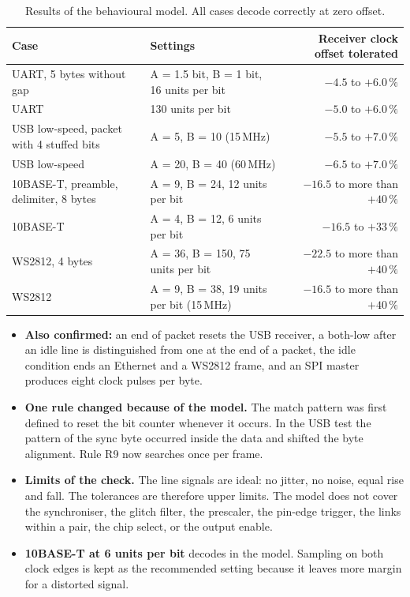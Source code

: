 \documentclass[10pt,a4paper]{article}
\begin{document}
\begin{table}[H]
\centering\small
\begin{tabularx}{\linewidth}{@{}Llr@{}}
\toprule
Case & Settings & Receiver clock offset tolerated \\
\midrule
UART, 5 bytes without gap & A = 1.5 bit, B = 1 bit, 16 units per bit & $-4.5$ to $+6.0\,\%$ \\
UART & 130 units per bit & $-5.0$ to $+6.0\,\%$ \\
USB low-speed, packet with 4 stuffed bits & A = 5, B = 10 (15\,MHz) & $-5.5$ to $+7.0\,\%$ \\
USB low-speed & A = 20, B = 40 (60\,MHz) & $-6.5$ to $+7.0\,\%$ \\
10BASE-T, preamble, delimiter, 8 bytes & A = 9, B = 24, 12 units per bit & $-16.5$ to more than $+40\,\%$ \\
10BASE-T & A = 4, B = 12, 6 units per bit & $-16.5$ to $+33\,\%$ \\
WS2812, 4 bytes & A = 36, B = 150, 75 units per bit & $-22.5$ to more than $+40\,\%$ \\
WS2812 & A = 9, B = 38, 19 units per bit (15\,MHz) & $-16.5$ to more than $+40\,\%$ \\
\bottomrule
\end{tabularx}
\caption{Results of the behavioural model. All cases decode correctly at zero offset.}
\end{table}

\begin{itemize}
\item \textbf{Also confirmed:} an end of packet resets the USB receiver, a both-low after an idle line is
distinguished from one at the end of a packet, the idle condition ends an Ethernet and a WS2812 frame, and an
SPI master produces eight clock pulses per byte.
\item \textbf{One rule changed because of the model.} The match pattern was first defined to reset the bit counter
whenever it occurs. In the USB test the pattern of the sync byte occurred inside the data and shifted the byte
alignment. Rule R9 now searches once per frame.
\item \textbf{Limits of the check.} The line signals are ideal: no jitter, no noise, equal rise and fall. The
tolerances are therefore upper limits. The model does not cover the synchroniser, the glitch filter, the
prescaler, the pin-edge trigger, the links within a pair, the chip select,
or the output enable.
\item \textbf{10BASE-T at 6 units per bit} decodes in the model. Sampling on both clock edges is kept as the
recommended setting because it leaves more margin for a distorted signal.
\end{itemize}
\end{document}
